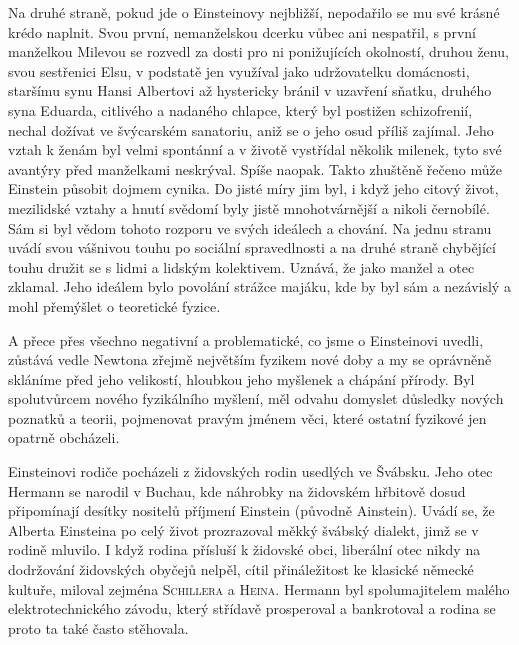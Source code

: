         Na druhé straně, pokud jde o Einsteinovy nejbližší, nepodařilo se mu své krásné krédo
        naplnit. Svou první, nemanželskou dcerku vůbec ani nespatřil, s první manželkou Milevou se
        rozvedl za dosti pro ni ponižujících okolností, druhou ženu, svou sestřenici Elsu, v
        podstatě jen využíval jako udržovatelku domácnosti, staršímu synu Hansi Albertovi až
        hystericky bránil v uzavření sňatku, druhého syna Eduarda, citlivého a nadaného chlapce,
        který byl postižen schizofrenií, nechal dožívat ve švýcarském sanatoriu, aniž se o jeho osud
        příliš zajímal. Jeho vztah k ženám byl velmi spontánní a v životě vystřídal několik milenek,
        tyto své avantýry před manželkami neskrýval. Spíše naopak. Takto zhuštěně řečeno může
        Einstein působit dojmem cynika. Do jisté míry jim byl, i když jeho citový život, mezilidské
        vztahy a hnutí svědomí byly jistě mnohotvárnější a nikoli černobílé. Sám si byl vědom tohoto
        rozporu ve svých ideálech a chování. Na jednu stranu uvádí svou vášnivou touhu po sociální
        spravedlnosti a na druhé straně chybějící touhu družit se s lidmi a lidským kolektivem.
        Uznává, že jako manžel a otec zklamal. Jeho ideálem bylo povolání strážce majáku, kde by byl
        sám a nezávislý a mohl přemýšlet o teoretické fyzice.

        A přece přes všechno negativní a problematické, co jsme o Einsteinovi uvedli, zůstává vedle
        Newtona zřejmě největším fyzikem nové doby a my se oprávněně skláníme před jeho velikostí,
        hloubkou jeho myšlenek a chápání přírody. Byl spolutvůrcem nového fyzikálního myšlení, měl
        odvahu domyslet důsledky nových poznatků a teorii, pojmenovat pravým jménem věci, které
        ostatní fyzikové jen opatrně obcházeli.

        Einsteinovi rodiče pocházeli z židovských rodin usedlých ve Švábsku. Jeho otec Hermann se
        narodil v Buchau, kde náhrobky na židovském hřbitově dosud připomínají desítky nositelů
        příjmení Einstein (původně Ainstein). Uvádí se, že Alberta Einsteina po celý život
        prozrazoval měkký švábský dialekt, jimž se v rodině mluvilo. I když rodina přísluší k
        židovské obci, liberální otec nikdy na dodržování židovských obyčejů nelpěl, cítil
        přináležitost ke klasické německé kultuře, miloval zejména \textsc{Schillera} a
        \textsc{Heina}. Hermann byl spolumajitelem malého elektrotechnického závodu, který střídavě
        prosperoval a bankrotoval a rodina se proto ta také často stěhovala.

